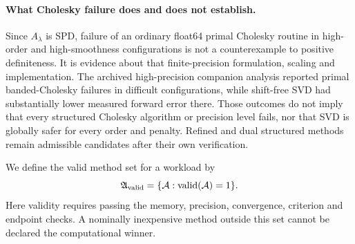 \paragraph{What Cholesky failure does and does not establish.}
Since $A_\lambda$ is SPD, failure of an ordinary float64 primal Cholesky routine in high-order and high-smoothness configurations is not a counterexample to positive definiteness. It is evidence about that finite-precision formulation, scaling and implementation. The archived high-precision companion analysis reported primal banded-Cholesky failures in difficult configurations, while shift-free SVD had substantially lower measured forward error there. Those outcomes do not imply that every structured Cholesky algorithm or precision level fails, nor that SVD is globally safer for every order and penalty. Refined and dual structured methods remain admissible candidates after their own verification.

We define the valid method set for a workload by
\begin{equation}\label{eq:valid}
\mathfrak A_{\rm valid}
=\{\mathcal A:\operatorname{valid}(\mathcal A)=1\}.
\end{equation}
Here validity requires passing the memory, precision,
convergence, criterion and endpoint checks.
A nominally inexpensive method outside this set cannot be declared the computational winner.
